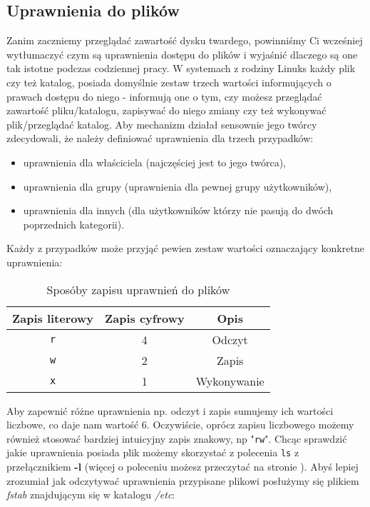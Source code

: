 \subsection{Uprawnienia do plików}
\label{sec:uprawnienia}
Zanim zaczniemy przeglądać zawartość dysku twardego, powinniśmy Ci wcześniej wytłumaczyć czym są uprawnienia dostępu do plików i wyjaśnić dlaczego są one tak istotne podczas codziennej pracy.
\newline
\newline
W systemach z rodziny Linuks każdy plik czy też katalog, posiada domyślnie zestaw trzech wartości informujących o prawach dostępu do niego - informują one o tym, czy możesz przeglądać zawartość pliku/katalogu, zapisywać do niego zmiany czy też wykonywać plik/przeglądać katalog. Aby mechanizm działał sensownie jego twórcy zdecydowali, że należy definiować uprawnienia dla trzech przypadków:
\begin{itemize}
\item uprawnienia dla właściciela (najczęściej jest to jego twórca),
\item uprawnienia dla grupy (uprawnienia dla pewnej grupy użytkowników),
\item uprawnienia dla innych (dla użytkowników którzy nie pasują do dwóch poprzednich kategorii).
\end{itemize}
Każdy z przypadków może przyjąć pewien zestaw wartości oznaczający konkretne uprawnienia:
\begin{table}[h!t]
\begin{center}
\begin{tabular}{|c|c|c|} \hline
Zapis literowy & Zapis cyfrowy & Opis \\ \hline
\texttt{r} & 4 & Odczyt \\ \hline
\texttt{w} & 2 & Zapis \\ \hline
\texttt{x} & 1 & Wykonywanie \\ \hline
\end{tabular}
\caption{Sposóby zapisu uprawnień do plików}
\label{tab:uprawnienia}
\end{center}
\end{table}
\newline
Aby zapewnić różne uprawnienia np. odczyt i zapis sumujemy ich wartości liczbowe, co daje nam wartość 6. Oczywiście, oprócz zapisu liczbowego możemy również stosować bardziej intuicyjny zapis znakowy, np "\texttt{rw}". Chcąc sprawdzić jakie uprawnienia posiada plik możemy skorzystać z polecenia \texttt{ls} z przełącznikiem \textbf{-l} (więcej o poleceniu możesz przeczytać na stronie \pageref{sec:ls}). Abyś lepiej zrozumiał jak odczytywać uprawnienia przypisane plikowi posłużymy się plikiem \textit{fstab} znajdującym się w katalogu \textit{/etc}:
